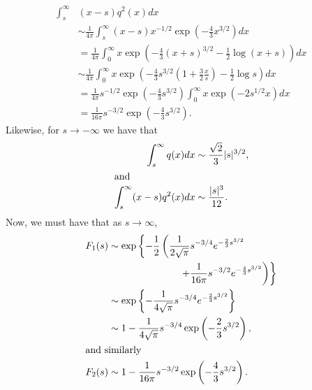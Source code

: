 \documentclass[final]{IEEEtran}
\begin{document}
\begin{align*}
    \int_s^\infty & (x - s) q^2(x) dx \\
        & \sim \frac{1}{4 \pi}
              \int_s^\infty
                  (x - s)
                  x^{-1/2}
                  \exp\left( -\frac{4}{3} x^{3/2} \right)
                  dx \\
        &= \frac{1}{4 \pi}
           \int_0^\infty
               x
               \exp\left(
                   -\frac{4}{3} (x + s)^{3/2}
                   -\frac{1}{2} \log( x + s )
               \right)
               dx \\
        &\sim \frac{1}{4 \pi}
              \int_0^\infty
              x
              \exp\left(
                  -\frac{4}{3}s^{3/2}
                  \left( 1 + \frac{3}{2} \frac{x}{s} \right)
                  - \frac{1}{2} \log s
              \right)
              dx \\
        &= \frac{1}{4 \pi}
           s^{-1/2}
           \exp\left( -\frac{4}{3} s^{3/2} \right)
           \int_0^\infty
                x
                \exp\left(
                    -2 s^{1/2} x
                \right)
                dx \\
        &= \frac{1}{16 \pi}
           s^{-3/2}
           \exp\left( -\frac{4}{3} s^{3/2} \right).
\end{align*}
Likewise, for $s \to -\infty$ we have that
\begin{align*}
    \int_s^\infty q(x) dx &\sim \frac{\sqrt{2}}{3} |s|^{3/2}, \\
\intertext{and}
    \int_s^\infty (x - s) q^2(x) dx &\sim \frac{|s|^3}{12}.
\end{align*}
Now, we must have that as $s\to\infty$,
\begin{align*}
    F_1(s)
        &\sim \exp\left\{
                  -\frac{1}{2}
                  \left(
                      \frac{1}{2 \sqrt{\pi}}
                      s^{-3/4}
                      e^{-\frac{2}{3} s^{3/2}}
                      \right. \right.
                      \\ & \qquad \qquad \qquad \quad\,
                      \left. \left.
                      +
                      \frac{1}{16 \pi}
                      s^{-3/2}
                      e^{-\frac{4}{3} s^{3/2}}
                  \right)
              \right\} \\
        &\sim \exp\left\{
                   -
                   \frac{1}{4 \sqrt{\pi}}
                   s^{-3/4}
                   e^{-\frac{2}{3} s^{3/2}}
              \right\} \\
        &\sim 1
              -
              \frac{1}{4 \sqrt{\pi}}
              s^{-3/4}
              \exp\left( -\frac{2}{3} s^{3/2} \right), \\
\intertext{and similarly}
    F_2(s) &\sim 1
                 -
                 \frac{1}{16 \pi}
                 s^{-3/2}
                 \exp\left( -\frac{4}{3} s^{3/2} \right).
\end{align*}
\end{document}
